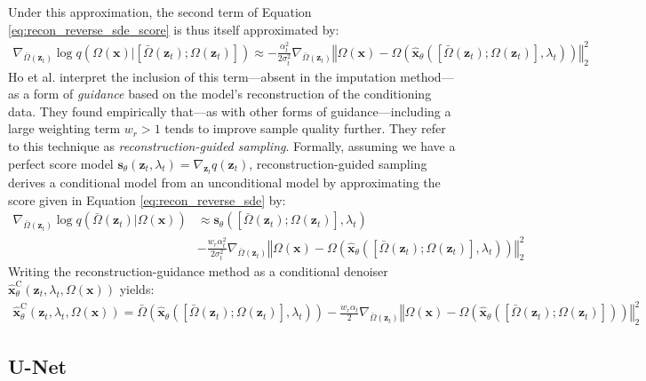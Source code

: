 \documentclass[ oneside,%
                    author={George Herbert},
                    degree={MSci},
                     title={Video Diffusion Models for Climate Simulations},
                  subtitle={}]{dissertation}
\begin{document}
Under this approximation, the second term of Equation \ref{eq:recon_reverse_sde_score} is thus itself approximated by:
\begin{align}
      \nabla_{\bar\Omega(\mathbf{z}_t)} \log q(\Omega(\mathbf{x})|[\bar\Omega(\mathbf{z}_t); \Omega(\mathbf{z}_t)])\approx-\frac{\alpha_t^2}{2\sigma_t^2}\nabla_{\bar\Omega(\mathbf{z}_t)} \left\Vert \Omega(\mathbf{x}) - \Omega\left(\hat{\mathbf{x}}_\theta\left([\bar\Omega(\mathbf{z}_t); \Omega(\mathbf{z}_t)], \lambda_t \right)\right)\right\Vert_2^2
\end{align}
Ho et al. \cite{VDM_Ho} interpret the inclusion of this term---absent in the imputation method---as a form of \textit{guidance} based on the model's reconstruction of the conditioning data. They found empirically that---as with other forms of guidance---including a large weighting term $w_r>1$ tends to improve sample quality further. They refer to this technique as \textit{reconstruction-guided sampling}. Formally, assuming we have a perfect score model $\mathbf{s}_\theta(\mathbf{z}_t, \lambda_t)=\nabla_{\mathbf{z}_t} q(\mathbf{z}_t)$, reconstruction-guided sampling derives a conditional model from an unconditional model by approximating the score given in Equation \ref{eq:recon_reverse_sde} by:
\begin{align}
      \nabla_{\bar\Omega(\mathbf{z}_t)}\log q(\bar\Omega(\mathbf{z}_t)|\Omega(\mathbf{x}))&\approx \mathbf{s}_\theta ([\bar\Omega(\mathbf{z}_t); \Omega(\mathbf{z}_t)], \lambda_t)\\&-\frac{w_r\alpha_t^2}{2\sigma_t^2}\nabla_{\bar\Omega(\mathbf{z}_t)} \left\Vert \Omega(\mathbf{x}) - \Omega\left(\hat{\mathbf{x}}_\theta\left([\bar\Omega(\mathbf{z}_t); \Omega(\mathbf{z}_t)], \lambda_t \right)\right)\right\Vert_2^2
\end{align}
Writing the reconstruction-guidance method as a conditional denoiser $\hat{\mathbf{x}}^{\mathrm{C}}_\theta(\mathbf{z}_t, \lambda_t, \Omega(\mathbf{x}))$ yields:
\begin{align}
      \hat{\mathbf{x}}^{\mathrm{C}}_\theta(\mathbf{z}_t, \lambda_t, \Omega(\mathbf{x}))=\bar\Omega\left(\hat{\mathbf{x}}_\theta([\bar\Omega(\mathbf{z}_t); \Omega(\mathbf{z}_t)], \lambda_t )\right) - \frac{w_r\alpha_t}{2}\nabla_{\bar\Omega(\mathbf{z}_t)} \left\Vert \Omega(\mathbf{x}) - \Omega\left(\hat{\mathbf{x}}_\theta\left([\bar\Omega(\mathbf{z}_t); \Omega(\mathbf{z}_t)]\right)\right)\right\Vert_2^2
\end{align}

\subsection{U-Net}
\label{sec:background_unet}
\end{document}
